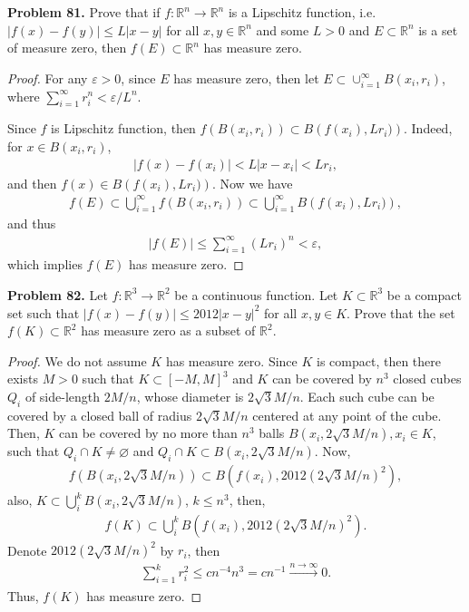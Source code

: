 \documentclass[11pt]{article}
\theoremstyle{definition}
\theoremstyle{definition}
\begin{document}
\noindent
{\bf Problem 81.}
Prove that if $f:\mathbb{R}^n\to\mathbb{R}^n$ is a Lipschitz function, i.e.
$|f(x)-f(y)|\leq L|x-y|$ for all $x,y\in\mathbb{R}^n$ and some $L>0$ and
$E\subset\mathbb{R}^n$ is a set of measure zero, then $f(E)\subset\mathbb{R}^n$
has measure zero.
\begin{proof}
For any $\varepsilon > 0$, since $E$ has measure zero, then let $E \subset \cup^\infty_{i=1} B(x_i, r_i)$, where $\sum^\infty_{i=1} r_i^n < \varepsilon/L^n$. 

Since $f$ is Lipschitz function, then $f \left(B(x_i, r_i)\right) \subset B \left(f(x_i), Lr_i)\right)$. Indeed, for $x \in B(x_i, r_i)$,
\begin{align*}
    |f(x) - f(x_i)| < L|x - x_i| < Lr_i,
\end{align*}
and then $f(x) \in B \left(f(x_i), Lr_i)\right)$. Now we have 
\begin{align*}
    f(E) \subset \bigcup^\infty_{i=1} f\left(B(x_i, r_i)\right) \subset \bigcup^\infty_{i=1} B \left(f(x_i), Lr_i)\right),
\end{align*}
and thus
\begin{align*}
    |f(E)| \leq \sum^\infty_{i=1} (Lr_i)^n < \varepsilon,
\end{align*}
which implies $f(E)$ has measure zero.
\end{proof}


\medskip

\noindent
{\bf Problem 82.}
Let $f:\mathbb{R}^3\to\mathbb{R}^2$ be a continuous function. Let $K\subset\mathbb{R}^3$ be a compact set such that $|f(x)-f(y)|\leq 2012|x-y|^{2}$
for all $x,y\in K$. Prove that the set $f(K)\subset\mathbb{R}^2$ has measure zero as a subset of $\mathbb{R}^2$.
\begin{proof}
We do not assume $K$ has measure zero. Since $K$ is compact, then there exists $M > 0$ such that $K \subset [-M,M]^3$ and $K$ can be covered by $n^3$ closed cubes $Q_i$ of side-length $2M/n$, whose diameter is $2\sqrt{3}M/n$. Each such cube can be covered by a closed ball of radius $2\sqrt{3}M/n$ centered at any point of the cube. Then, $K$ can be covered by no more than $n^3$ balls $B\left(x_i, 2\sqrt{3}M/n\right), x_i \in K$, such that $Q_i \cap K \neq \varnothing$ and $Q_i \cap K \subset B\left(x_i, 2\sqrt{3}M/n\right)$. Now, 
\begin{align*}
    f\left( B\left(x_i, 2\sqrt{3}M/n\right)\right) \subset B \left(f(x_i), 2012 \left(2\sqrt{3}M/n\right)^2 \right),
\end{align*}
also, $K \subset \bigcup^k_i B\left(x_i, 2\sqrt{3}M/n\right)$, $k \leq n^3$, then,
\begin{align*}
    f(K) \subset \bigcup^k_i B \left(f(x_i), 2012 \left(2\sqrt{3}M/n\right)^2 \right).
\end{align*}
Denote $2012 \left(2\sqrt{3}M/n\right)^2$ by $r_i$, then
\begin{align*}
    \sum^k_{i=1} r_i^2 \leq c n^{-4} n^3 = c n^{-1} \xrightarrow[]{n\to\infty} 0.
\end{align*}
Thus, $f(K)$ has measure zero.
\end{proof}
\end{document}

